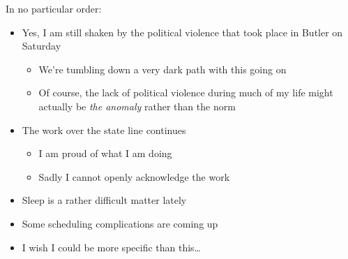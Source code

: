 In no particular order:

\begin{itemize}
\tightlist
\item
  Yes, I am still shaken by the political violence that took place in
  Butler on Saturday

  \begin{itemize}
  \tightlist
  \item
    We're tumbling down a very dark path with this going on
  \item
    Of course, the lack of political violence during much of my life
    might actually be \emph{the anomaly} rather than the norm
  \end{itemize}
\item
  The work over the state line continues

  \begin{itemize}
  \tightlist
  \item
    I am proud of what I am doing
  \item
    Sadly I cannot openly acknowledge the work
  \end{itemize}
\item
  Sleep is a rather difficult matter lately
\item
  Some scheduling complications are coming up
\item
  I wish I could be more specific than this\ldots{}
\end{itemize}
